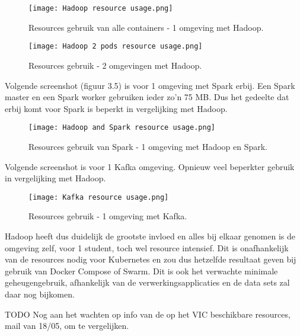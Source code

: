 \begin{figure}[H]
    \texttt{[image: Hadoop resource usage.png]}
    \caption{Resources gebruik van alle containers - 1 omgeving met Hadoop.}
\end{figure}

\begin{figure}[H]
    \texttt{[image: Hadoop 2 pods resource usage.png]}
    \caption{Resources gebruik - 2 omgevingen met Hadoop.}
\end{figure}

Volgende screenshot (figuur 3.5) is voor 1 omgeving met Spark erbij. Een Spark master en een Spark worker gebruiken ieder zo'n 75 MB. Dus het gedeelte dat erbij komt voor Spark is beperkt in vergelijking met Hadoop.
\begin{figure}[H]
    \texttt{[image: Hadoop and Spark resource usage.png]}
    \caption{Resources gebruik van Spark - 1 omgeving met Hadoop en Spark.}
\end{figure}

Volgende screenshot is voor 1 Kafka omgeving. Opnieuw veel beperkter gebruik in vergelijking met Hadoop.
\begin{figure}[H]
    \texttt{[image: Kafka resource usage.png]}
    \caption{Resources gebruik - 1 omgeving met Kafka.}
\end{figure}

Hadoop heeft dus duidelijk de grootste invloed en alles bij elkaar genomen is de omgeving zelf, voor 1 student, toch wel resource intensief. Dit is onafhankelijk van de resources nodig voor Kubernetes en zou dus hetzelfde resultaat geven bij gebruik van Docker Compose of Swarm.
\newline
Dit is ook het verwachte minimale geheugengebruik, afhankelijk van de verwerkingsapplicaties en de data sets zal daar nog bijkomen.
\newline

TODO Nog aan het wachten op info van de op het VIC beschikbare resources, mail van 18/05, om te vergelijken.


